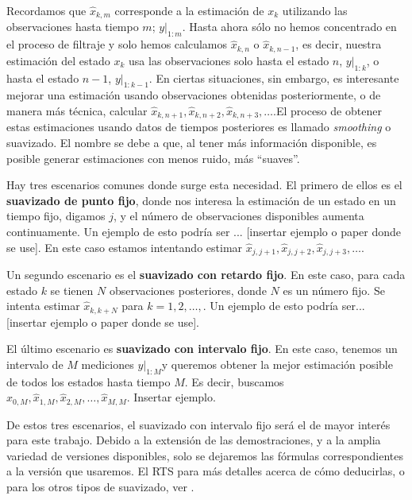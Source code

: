 
Recordamos que \(\hat{x}_{k,m}\) corresponde a la estimación de \(x_k\) utilizando las observaciones hasta tiempo \(m\); \(\left. y \right|_{1:m}\). Hasta ahora sólo no hemos concentrado en el proceso de filtraje y solo hemos calculamos \(\hat{x}_{k,n}\) o \(\hat{x}_{k, n-1}\), es decir, nuestra estimación del estado \(x_k\) usa las observaciones solo hasta el estado \(n\), \(\left. y \right|_{1:k}\), o hasta el estado \(n-1\),   \(\left. y \right|_{1:k-1}\). En ciertas situaciones, sin embargo, es interesante mejorar una estimación usando observaciones obtenidas posteriormente, o de manera más técnica, calcular \(\hat{x}_{k, n+1}, \hat{x}_{k, n+2}, \hat{x}_{k, n+3}, \dots\).El proceso de obtener estas estimaciones usando datos de tiempos posteriores es llamado \textit{smoothing} o suavizado. El nombre se debe a que, al tener más información disponible, es posible generar estimaciones con menos ruido, más ``suaves''.

Hay tres escenarios comunes donde surge esta necesidad. El primero de ellos es el \textbf{suavizado de punto fijo}, donde nos interesa la estimación de un estado en un tiempo fijo, digamos \(j\), y el número de observaciones disponibles aumenta continuamente. Un ejemplo de esto podría ser ... [insertar ejemplo o paper donde se use]. En este caso estamos intentando estimar \(\hat{x}_{j, j+1}, \hat{x}_{j, j+2}, \hat{x}_{j, j+3}, \dots\). 

Un segundo escenario es el \textbf{suavizado con retardo fijo}. En este caso, para cada estado \(k\) se tienen \(N\) observaciones posteriores, donde \(N\) es un número fijo. Se intenta estimar \(\hat{x}_{k, k+N}\) para \(k = 1, 2, \dots, \). Un ejemplo de esto podría ser... [insertar ejemplo o paper donde se use]. 

El último escenario es \textbf{suavizado con intervalo fijo}. En este caso, tenemos un intervalo de \(M\) mediciones \(\left. y \right|_{1:M}\)y queremos obtener la mejor estimación posible de todos los estados hasta tiempo \(M\). Es decir, buscamos \(\hat{x}_{0,M}, \hat{x}_{1,M}, \hat{x}_{2,M}, \dots, \hat{x}_{M,M}\). Insertar ejemplo.

De estos tres escenarios, el suavizado con intervalo fijo será el de mayor interés para este trabajo. Debido a la extensión de las demostraciones, y a la amplia variedad de versiones disponibles, solo se dejaremos las fórmulas correspondientes a la versión que usaremos. El RTS  para más detalles acerca de cómo deducirlas, o para los otros tipos de suavizado, ver \cite{Simon2006}.  \\ 

